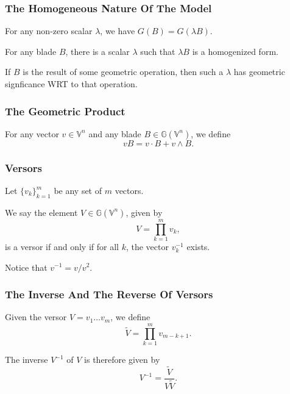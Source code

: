\documentclass{beamer}
\newcommand{\G}{\mathbb{G}}
\newcommand{\V}{\mathbb{V}}
\begin{document}
\begin{frame}
\frametitle{The Homogeneous Nature Of The Model}
\pause
For any non-zero scalar $\lambda$, we have $G(B)=G(\lambda B)$.\pause

For any blade $B$, there is a scalar $\lambda$ such that $\lambda B$ is a homogenized form.\pause

If $B$ is the result of some geometric operation, then such a $\lambda$ has geometric signficance
WRT to that operation.
\end{frame}

\begin{frame}
\frametitle{The Geometric Product}
\pause
\begin{definition}
For any vector $v\in\V^n$ and any blade $B\in\G(\V^n)$, we define
\begin{equation*}
vB = v\cdot B + v\wedge B.
\end{equation*}
\end{definition}
\end{frame}

\begin{frame}
\frametitle{Versors}
\pause
Let $\{v_k\}_{k=1}^m$ be any set of $m$ vectors.\pause
\begin{definition}
We say the element $V\in\G(\V^n)$, given by
\begin{equation*}
V = \prod_{k=1}^m v_k,
\end{equation*}
is a versor if and only if for all $k$, the vector $v_k^{-1}$ exists.
\end{definition}\pause
Notice that $v^{-1}=v/v^2$.
\end{frame}

\begin{frame}
\frametitle{The Inverse And The Reverse Of Versors}
\pause
\begin{definition}
Given the versor $V=v_1\dots v_m$, we define
\begin{equation*}
\tilde{V} = \prod_{k=1}^m v_{m-k+1}.
\end{equation*}
\end{definition}\pause
The inverse $V^{-1}$ of $V$ is therefore given by
\begin{equation*}
V^{-1} = \frac{\tilde{V}}{V\tilde{V}}.
\end{equation*}
\end{frame}
\end{document}
